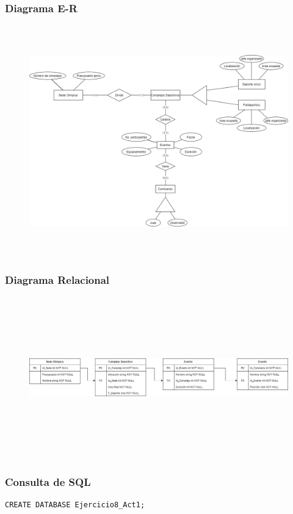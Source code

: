 \documentclass[a4paper, 12pt]{article}
\begin{document}
\begin{justify}
        \subsubsection{Diagrama E-R}
        \begin{figure}[H]
            \centering
            \includegraphics[width=16cm,height=10cm]{er8.png}
        \end{figure}
        \subsubsection{Diagrama Relacional}
        \begin{figure}[H]
            \centering
            \includegraphics[width=15cm,height=7cm]{rel8.jpg}
        \end{figure}
        \subsubsection{Consulta de SQL}
\begin{verbatim}
CREATE DATABASE Ejercicio8_Act1;


\end{verbatim}
\end{justify}
\end{document}

